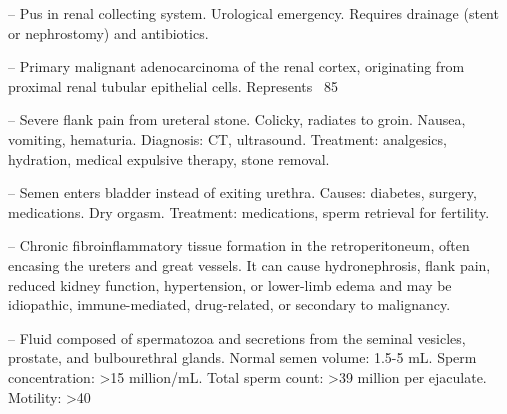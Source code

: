 -- Pus in renal collecting system. Urological emergency. Requires drainage (stent or nephrostomy) and antibiotics.

-- Primary malignant adenocarcinoma of the renal cortex, originating from proximal renal tubular epithelial cells. Represents ~85%

-- Severe flank pain from ureteral stone. Colicky, radiates to groin. Nausea, vomiting, hematuria. Diagnosis: CT, ultrasound. Treatment: analgesics, hydration, medical expulsive therapy, stone removal.

-- Semen enters bladder instead of exiting urethra. Causes: diabetes, surgery, medications. Dry orgasm. Treatment: medications, sperm retrieval for fertility.

-- Chronic fibroinflammatory tissue formation in the retroperitoneum, often encasing the ureters and great vessels. It can cause hydronephrosis, flank pain, reduced kidney function, hypertension, or lower-limb edema and may be idiopathic, immune-mediated, drug-related, or secondary to malignancy.

-- Fluid composed of spermatozoa and secretions from the seminal vesicles, prostate, and bulbourethral glands. Normal semen volume: 1.5-5 mL. Sperm concentration: >15 million/mL. Total sperm count: >39 million per ejaculate. Motility: >40%

